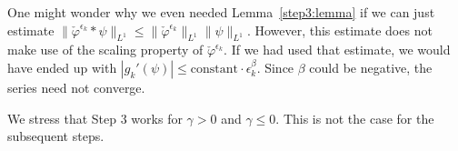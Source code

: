 \begin{remark}
One might wonder why we even needed Lemma~\ref{step3:lemma} if we can just estimate \(\lVert \check \varphi^{\epsilon_k} * \psi \rVert_{L^1} \leq \lVert \check \varphi^{\epsilon_k} \rVert_{L^1} \lVert \psi \rVert_{L^1}\). However, this estimate does not make use of the scaling property of \(\check \varphi^{\epsilon_k}\). If we had used that estimate, we would have ended up with \(|g_k'(\psi)| \leq \mathrm{constant} \cdot \epsilon_k^{\beta}\). Since \(\beta\) could be negative, the series need not converge.
\end{remark}

We stress that Step 3 works for \(\gamma > 0\) and \(\gamma \leq 0\). This is not the case for the subsequent steps.  
